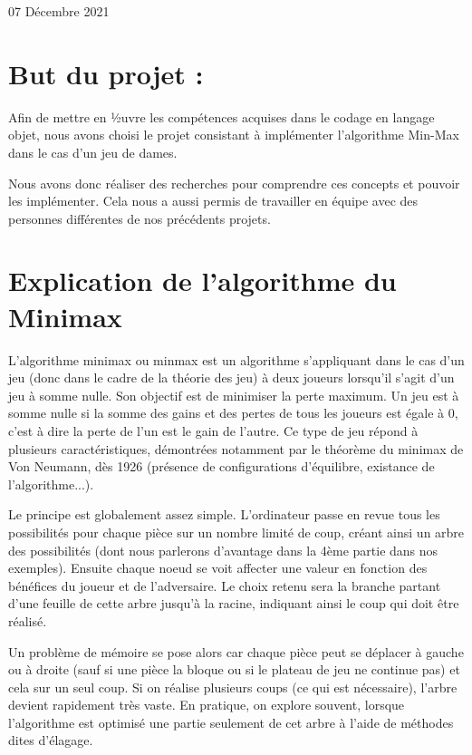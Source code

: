 \documentclass[12,french]{report}
\begin{document}
\begin{titlepage}
\begin{center}
	\vfill
	{\large 07 Décembre 2021}
\end{center}
\end{titlepage}

\tableofcontents


\renewcommand{\chaptername}{}

\section{But du projet :}

Afin de mettre en ½uvre les compétences acquises dans le codage en
langage objet, nous avons choisi le projet consistant à implémenter
l'algorithme Min-Max dans le cas d'un jeu de dames.

Nous avons donc réaliser des recherches pour comprendre ces concepts
et pouvoir les implémenter. Cela nous a aussi permis de travailler
en équipe avec des personnes différentes de nos précédents projets.

\section{Explication de l'algorithme du Minimax }

L'algorithme minimax ou minmax est un algorithme s'appliquant dans
le cas d'un jeu (donc dans le cadre de la théorie des jeu) à deux
joueurs lorsqu'il s'agit d'un jeu à somme nulle. Son objectif est
de minimiser la perte maximum. Un jeu est à somme nulle si la somme
des gains et des pertes de tous les joueurs est égale à 0, c'est à
dire la perte de l'un est le gain de l'autre. Ce type de jeu répond
à plusieurs caractéristiques, démontrées notamment par le théorème
du minimax de Von Neumann, dès 1926 (présence de configurations d'équilibre,
existance de l'algorithme...).

Le principe est globalement assez simple. L'ordinateur passe en revue
tous les possibilités pour chaque pièce sur un nombre limité de coup,
créant ainsi un arbre des possibilités (dont nous parlerons d'avantage
dans la 4ème partie dans nos exemples). Ensuite chaque noeud se voit
affecter une valeur en fonction des bénéfices du joueur et de l'adversaire.
Le choix retenu sera la branche partant d'une feuille de cette arbre
jusqu'à la racine, indiquant ainsi le coup qui doit être réalisé. 

Un problème de mémoire se pose alors car chaque pièce peut se déplacer
à gauche ou à droite (sauf si une pièce la bloque ou si le plateau
de jeu ne continue pas) et cela sur un seul coup. Si on réalise plusieurs
coups (ce qui est nécessaire), l'arbre devient rapidement très vaste.
En pratique, on explore souvent, lorsque l'algorithme est optimisé
une partie seulement de cet arbre à l'aide de méthodes dites d'élagage.
\end{document}
